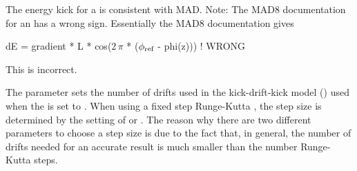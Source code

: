 The energy kick for a \bmad {} is consistent with MAD. 
Note: The MAD8 documentation for an  has a wrong
sign. Essentially the MAD8 documentation gives
\begin{example}
  dE = gradient * L * cos(\(2\,\pi\) * (\(\phi_{\text{ref}}\) - phi(z))) ! WRONG
\end{example}
This is incorrect. 

The  parameter sets the number of drifts used in the kick-drift-kick model
() used when the  is set to . When using
a fixed step Runge-Kutta , the step size is determined by the setting of
 or . The reason why there are two different parameters to choose a step
size is due to the fact that, in general, the number of drifts needed for an accurate result
is much smaller than the number Runge-Kutta steps.

